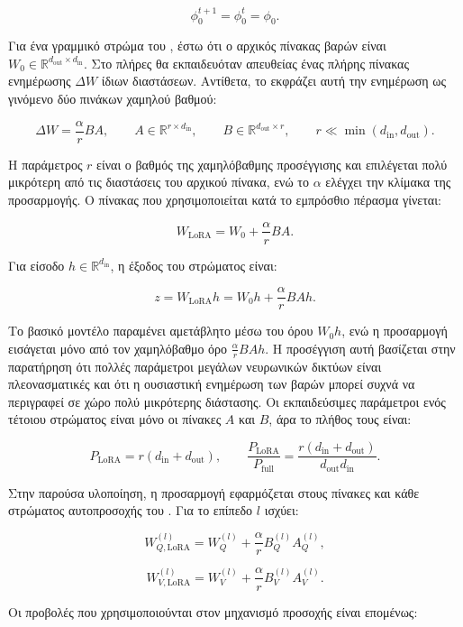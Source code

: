 \[
\phi_0^{t+1} = \phi_0^t = \phi_0.
\]

Για ένα γραμμικό στρώμα του , έστω ότι ο αρχικός πίνακας βαρών είναι \(W_0 \in \mathbb{R}^{d_{\mathrm{out}} \times d_{\mathrm{in}}}\). Στο πλήρες  θα εκπαιδευόταν απευθείας ένας πλήρης πίνακας ενημέρωσης \(\Delta W\) ίδιων διαστάσεων. Αντίθετα, το  εκφράζει αυτή την ενημέρωση ως γινόμενο δύο πινάκων χαμηλού βαθμού:

\[
\Delta W = \frac{\alpha}{r}BA,
\qquad
A \in \mathbb{R}^{r \times d_{\mathrm{in}}},
\qquad
B \in \mathbb{R}^{d_{\mathrm{out}} \times r},
\qquad
r \ll \min(d_{\mathrm{in}}, d_{\mathrm{out}}).
\]

Η παράμετρος \(r\) είναι ο βαθμός της χαμηλόβαθμης προσέγγισης και επιλέγεται πολύ μικρότερη από τις διαστάσεις του αρχικού πίνακα, ενώ το \(\alpha\) ελέγχει την κλίμακα της προσαρμογής. Ο πίνακας που χρησιμοποιείται κατά το εμπρόσθιο πέρασμα γίνεται:

\[
W_{\mathrm{LoRA}}
=
W_0
+
\frac{\alpha}{r}BA.
\]

Για είσοδο \(h \in \mathbb{R}^{d_{\mathrm{in}}}\), η έξοδος του στρώματος είναι:

\[
z
=
W_{\mathrm{LoRA}}h
=
W_0h
+
\frac{\alpha}{r}BAh.
\]

Το βασικό μοντέλο παραμένει αμετάβλητο μέσω του όρου \(W_0h\), ενώ η προσαρμογή εισάγεται μόνο από τον χαμηλόβαθμο όρο \(\frac{\alpha}{r}BAh\). Η προσέγγιση αυτή βασίζεται στην παρατήρηση ότι πολλές παράμετροι μεγάλων νευρωνικών δικτύων είναι πλεονασματικές και ότι η ουσιαστική ενημέρωση των βαρών μπορεί συχνά να περιγραφεί σε χώρο πολύ μικρότερης διάστασης. Οι εκπαιδεύσιμες παράμετροι ενός τέτοιου στρώματος είναι μόνο οι πίνακες \(A\) και \(B\), άρα το πλήθος τους είναι:

\[
P_{\mathrm{LoRA}}
=
r(d_{\mathrm{in}} + d_{\mathrm{out}}),
\qquad
\frac{P_{\mathrm{LoRA}}}{P_{\mathrm{full}}}
=
\frac{r(d_{\mathrm{in}} + d_{\mathrm{out}})}
{d_{\mathrm{out}}d_{\mathrm{in}}}.
\]

Στην παρούσα υλοποίηση, η  προσαρμογή εφαρμόζεται στους πίνακες  και  κάθε στρώματος αυτοπροσοχής του . Για το επίπεδο \(l\) ισχύει:

\[
W_{Q,\mathrm{LoRA}}^{(l)}
=
W_Q^{(l)}
+
\frac{\alpha}{r}B_Q^{(l)}A_Q^{(l)},
\]

\[
W_{V,\mathrm{LoRA}}^{(l)}
=
W_V^{(l)}
+
\frac{\alpha}{r}B_V^{(l)}A_V^{(l)}.
\]

Οι προβολές που χρησιμοποιούνται στον μηχανισμό προσοχής είναι επομένως:

